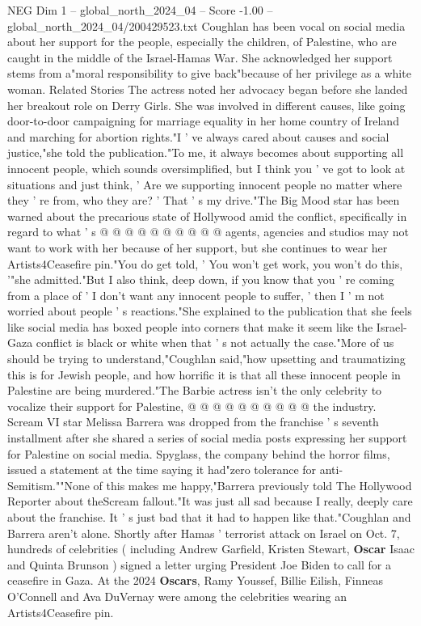 \begin{textsample}{NEG Dim 1 – global\_north\_2024\_04 – Score -1.00 – global\_north\_2024\_04/200429523.txt}  \label{ex:f1_neg_297}
Coughlan has been vocal on social media about her support for the people, especially the children, of Palestine, who are caught in the middle of the Israel-Hamas War.
She acknowledged her support stems from a"moral responsibility to give back"because of her privilege as a white woman.
Related Stories The actress noted her advocacy began before she landed her breakout role on Derry Girls.
She was involved in different causes, like going door-to-door campaigning for marriage equality in her home country of Ireland and marching for abortion rights."I ' ve always cared about causes and social justice,"she told the publication."To me, it always becomes about supporting all innocent people, which sounds oversimplified, but I think you ' ve got to look at situations and just think, ' Are we supporting innocent people no matter where they ' re from, who they are? ' That ' s my drive."The Big Mood star has been warned about the precarious state of Hollywood amid the conflict, specifically in regard to what ' s @ @ @ @ @ @ @ @ @ @ agents, agencies and studios may not want to work with her because of her support, but she continues to wear her Artists4Ceasefire pin."You do get told, ' You won't get work, you won't do this, '"she admitted."But I also think, deep down, if you know that you ' re coming from a place of ' I don't want any innocent people to suffer, ' then I ' m not worried about people ' s reactions."She explained to the publication that she feels like social media has boxed people into corners that make it seem like the Israel-Gaza conflict is black or white when that ' s not actually the case."More of us should be trying to understand,"Coughlan said,"how upsetting and traumatizing this is for Jewish people, and how horrific it is that all these innocent people in Palestine are being murdered."The Barbie actress isn't the only celebrity to vocalize their support for Palestine, @ @ @ @ @ @ @ @ @ @ the industry.
Scream VI star Melissa Barrera was dropped from the franchise ' s seventh installment after she shared a series of social media posts expressing her support for Palestine on social media.
Spyglass, the company behind the horror films, issued a statement at the time saying it had"zero tolerance for anti-Semitism.""None of this makes me happy,"Barrera previously told The Hollywood Reporter about theScream fallout."It was just all sad because I really, deeply care about the franchise.
It ' s just bad that it had to happen like that."Coughlan and Barrera aren't alone.
Shortly after Hamas ' terrorist attack on Israel on Oct. 7, hundreds of celebrities ( including Andrew Garfield, Kristen Stewart, \textbf{Oscar} Isaac and Quinta Brunson ) signed a letter urging President Joe Biden to call for a ceasefire in Gaza.
At the 2024 \textbf{Oscars}, Ramy Youssef, Billie Eilish, Finneas O'Connell and Ava DuVernay were among the celebrities wearing an Artists4Ceasefire pin.

\end{textsample}
